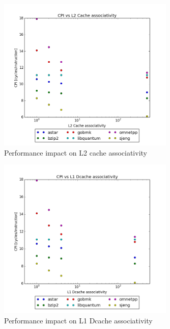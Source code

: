 \documentclass{article}
\begin{document}
\begin{figure}[ht]
    \centering
    \includegraphics[width=0.75\textwidth]{plots/CPI_vs_L2Cache_associativity.png}
    \caption{Performance impact on L2 cache associativity}
    \label{fig:cpivsl2assoc}
\end{figure}

\begin{figure}[ht]
    \centering
    \includegraphics[width=0.75\textwidth]{plots/CPI_vs_L1Dcache_associativity.png}
    \caption{Performance impact on L1 Dcache associativity}
    \label{fig:cpivsl1assoc}
\end{figure}
\end{document}
